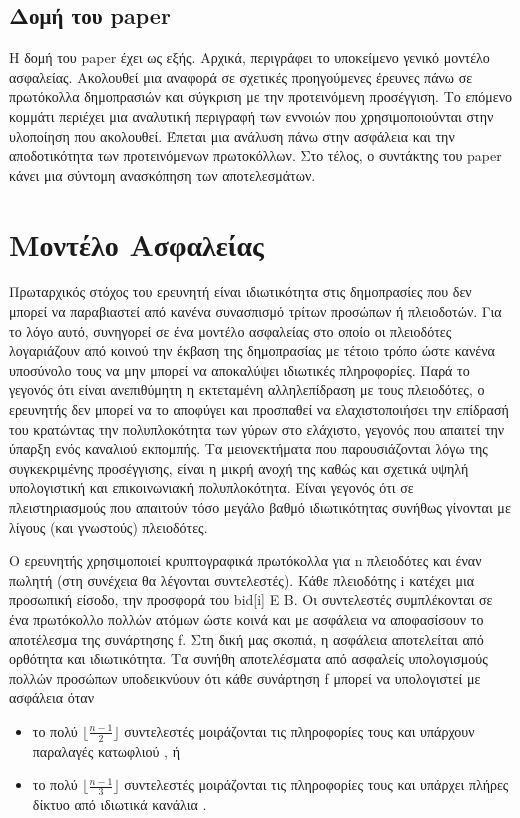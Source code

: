 \documentclass[a4paper,11pt]{article}
\begin{document}
\subsection{Δομή του paper}

Η δομή του paper έχει ως εξής. Αρχικά, περιγράφει το υποκείμενο γενικό μοντέλο ασφαλείας. Ακολουθεί μια αναφορά
σε σχετικές προηγούμενες έρευνες πάνω σε πρωτόκολλα δημοπρασιών και σύγκριση με την προτεινόμενη προσέγγιση. Το
επόμενο κομμάτι περιέχει μια αναλυτική περιγραφή των εννοιών που χρησιμοποιούνται στην υλοποίηση που ακολουθεί.
Έπεται μια ανάλυση πάνω στην ασφάλεια και την αποδοτικότητα των προτεινόμενων πρωτοκόλλων. Στο τέλος, ο
συντάκτης του paper κάνει μια σύντομη ανασκόπηση των αποτελεσμάτων.

\section{Μοντέλο Ασφαλείας}

Πρωταρχικός στόχος του ερευνητή είναι ιδιωτικότητα στις δημοπρασίες που δεν μπορεί να παραβιαστεί από κανένα
συνασπισμό τρίτων προσώπων ή πλειοδοτών. Για το λόγο αυτό, συνηγορεί σε ένα μοντέλο ασφαλείας στο οποίο οι
πλειοδότες λογαριάζουν από κοινού την έκβαση της δημοπρασίας με τέτοιο τρόπο ώστε κανένα υποσύνολο τους να μην
μπορεί να αποκαλύψει ιδιωτικές πληροφορίες. Παρά το γεγονός ότι είναι ανεπιθύμητη η εκτεταμένη αλληλεπίδραση με
τους πλειοδότες, ο ερευνητής δεν μπορεί να το αποφύγει και προσπαθεί να ελαχιστοποιήσει την επίδρασή του
κρατώντας την πολυπλοκότητα των γύρων στο ελάχιστο, γεγονός που απαιτεί την ύπαρξη ενός καναλιού εκπομπής. Τα
μειονεκτήματα που παρουσιάζονται λόγω της συγκεκριμένης προσέγγισης, είναι η μικρή ανοχή της καθώς και σχετικά
υψηλή υπολογιστική και επικοινωνιακή πολυπλοκότητα. Είναι γεγονός ότι σε πλειστηριασμούς που απαιτούν τόσο
μεγάλο βαθμό ιδιωτικότητας συνήθως γίνονται με λίγους (και γνωστούς) πλειοδότες.

Ο ερευνητής χρησιμοποιεί κρυπτογραφικά πρωτόκολλα για n πλειοδότες και έναν πωλητή (στη συνέχεια θα λέγονται
συντελεστές). Κάθε πλειοδότης i κατέχει μια προσωπική είσοδο, την προσφορά του bid[i] E B. Οι συντελεστές
συμπλέκονται σε ένα πρωτόκολλο πολλών ατόμων ώστε κοινά και με ασφάλεια να αποφασίσουν το αποτέλεσμα της
συνάρτησης f. Στη δική μας σκοπιά, η ασφάλεια αποτελείται από ορθότητα και ιδιωτικότητα. Τα συνήθη
αποτελέσματα από ασφαλείς υπολογισμούς πολλών προσώπων υποδεικνύουν ότι κάθε συνάρτηση f μπορεί να υπολογιστεί
με ασφάλεια όταν
\begin{itemize}
	\item το πολύ $\lfloor \frac{n-1}{2} \rfloor$ συντελεστές μοιράζονται τις πληροφορίες τους και υπάρχουν παραλαγές κατωφλιού \cite{GMW}, ή 
	\item το πολύ $\lfloor \frac{n-1}{3} \rfloor$ συντελεστές μοιράζονται τις πληροφορίες τους και υπάρχει πλήρες δίκτυο από
ιδιωτικά κανάλια \cite{OGW,CCD}.
\end{itemize}
\end{document}
